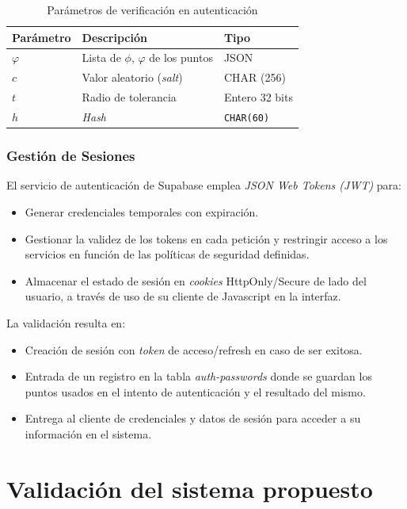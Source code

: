 \begin{table}[ht]
	\centering
	\caption{Parámetros de verificación en autenticación}
	\label{tab:parametros-verificacion}
	\begin{tabularx}{\textwidth}{lXl}
		\toprule
		\textbf{Parámetro} & \textbf{Descripción} & \textbf{Tipo} \\
		\midrule
		$\varphi$ & Lista de $\phi$, $\varphi$ de los puntos & JSON \\
		$c$ & Valor aleatorio  (\textit{salt}) & CHAR (256) \\
		$t$ & Radio de tolerancia & Entero 32 bits \\
		$h$ & \textit{Hash} & \texttt{CHAR(60)} \\
		\bottomrule
	\end{tabularx}
\end{table}

\subsubsection{Gestión de Sesiones}
El servicio de autenticación de Supabase emplea \textit{JSON Web Tokens (JWT)} para:

\begin{itemize}
	\item Generar credenciales temporales con expiración.
	\item Gestionar la validez de los tokens en cada petici\'on y restringir acceso a los servicios en funci\'on de las pol\'iticas de seguridad definidas.
	\item Almacenar el estado de sesión en \textit{cookies} HttpOnly/Secure de lado del usuario, a trav\'es de uso de su cliente de Javascript en la interfaz.
\end{itemize}

La validación resulta en:
\begin{itemize}
	\item Creación de sesión con \textit{token} de acceso/refresh en caso de ser exitosa.
	\item Entrada de un registro en la tabla \textit{auth-passwords} donde se guardan los puntos usados en el intento de autenticaci\'on y el resultado del mismo.
	\item Entrega al cliente de credenciales y datos de sesi\'on para acceder a su informaci\'on en el sistema.
\end{itemize}

\section{Validaci\'on del sistema propuesto}


